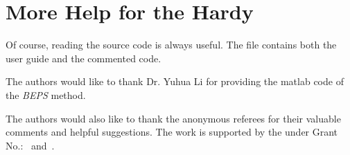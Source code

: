\section{More Help for the Hardy}

Of course, reading the source code is always useful.  The file
 contains both the user guide and the commented
code.

\begin{acks}
  The authors would like to thank Dr. Yuhua Li for providing the
  matlab code of  the \textit{BEPS} method. 

  The authors would also like to thank the anonymous referees for
  their valuable comments and helpful suggestions. The work is
  supported by the  under Grant
  No.:~
  and~.

\end{acks}
